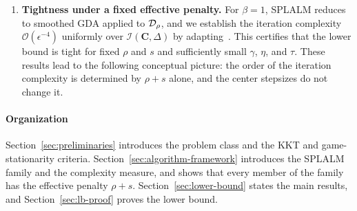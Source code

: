 \begin{enumerate}
    \item \textbf{Tightness under a fixed effective penalty.}
    For $\beta=1$, SPLALM reduces to smoothed GDA applied to $\mathcal{D}_\rho$, and
    we establish the iteration complexity $\mathcal O(\epsilon^{-4})$ uniformly
    over $\mathcal I(\mathbf C,\Delta)$ by adapting~\cite{zhang2020smoothed}.
    This certifies that the lower bound is tight for fixed $\rho$ and $s$ and
    sufficiently small $\gamma$, $\eta$, and $\tau$. These results lead to the
    following conceptual picture: the order of the iteration complexity is
    determined by $\rho+s$ alone, and the center stepsizes do not change it.
\end{enumerate}





\paragraph{Organization}
Section~\ref{sec:preliminaries} introduces the problem class and the KKT and
game-stationarity criteria. Section~\ref{sec:algorithm-framework} introduces
the SPLALM family and the complexity measure, and shows that every member
of the family has the effective penalty
$\rho+s$. Section~\ref{sec:lower-bound} states the main results, and
Section~\ref{sec:lb-proof} proves the lower bound.
